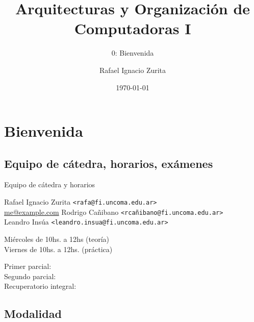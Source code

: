 \documentclass[aspectratio=169,compress]{beamer}
\title{Arquitecturas y Organización de Computadoras I}
\subtitle{0: Bienvenida}
\author{Rafael Ignacio Zurita}
\institute{Depto. Ingeniería de Computadoras}
\date{\today}
\begin{document}
\begin{frame}
  \maketitle
\end{frame}

\section{Bienvenida}
\subsection{Equipo de cátedra, horarios, exámenes}

\begin{frame}{Equipo de cátedra y horarios}
  \begin{description}
  \item[Docentes]
\begin{small}
    Rafael Ignacio Zurita \texttt{\footnotesize<rafa@fi.uncoma.edu.ar>}\\
\href{mailto:me@example.com}{me@example.com}
    Rodrigo Cañibano \texttt{\footnotesize<rcañibano@fi.uncoma.edu.ar>}\\
    Leandro Insúa \texttt{\footnotesize<leandro.insua@fi.uncoma.edu.ar>}\\
\end{small}
  \item[Horarios]
        Miércoles de 10hs. a 12hs (teoría)\\
        Viernes de 10hs. a 12hs. (práctica)\\
  \item[Exámenes]
        Primer parcial:\\ 
        Segundo parcial:\\
        Recuperatorio integral:
  

  \end{description}
\end{frame}


\subsection{Modalidad}
\end{document}
